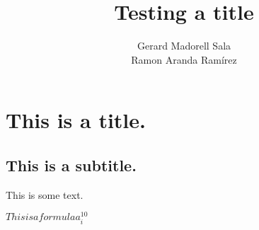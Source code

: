 \documentclass{article}
\begin{document}
 

\title{ Testing a title }

    
    \renewcommand{\today}{ November 2, 2014 }
    

    \author{
            Gerard Madorell Sala \\
            Ramon Aranda Ramírez \\
            }
    

    \maketitle

\section{This is a title.}

\subsection{This is a subtitle.}

This is some text.

$This is a formula a_i^{10}$


\end{document}

